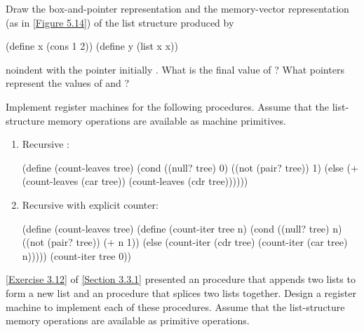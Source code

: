 \begin{exercise}
	\label{Exercise 5.20}
	Draw the box-and-pointer representation and the memory-vector representation (as in \cref{Figure 5.14}) of the list structure produced by
	\begin{scheme}
	  (define x (cons 1 2))
	  (define y (list x x))
	\end{scheme}
	noindent
	with the  pointer initially .
	What is the final value of  ?
	What pointers represent the values of  and  ?
\end{exercise}



\begin{exercise}
	\label{Exercise 5.21}
	Implement register machines for the following procedures.
	Assume that the list-structure memory operations are available as machine primitives.
	\begin{enumerate}[label = \alph*., leftmargin = *]

		\item
			Recursive :
			\begin{scheme}
			  (define (count-leaves tree)
			    (cond ((null? tree) 0)
			          ((not (pair? tree)) 1)
			          (else (+ (count-leaves (car tree))
			                   (count-leaves (cdr tree))))))
			\end{scheme}

		\item
			Recursive  with explicit counter:
			\begin{scheme}
			  (define (count-leaves tree)
			    (define (count-iter tree n)
			      (cond ((null? tree) n)
			            ((not (pair? tree)) (+ n 1))
			            (else
			             (count-iter (cdr tree)
			                         (count-iter (car tree)
			                                     n)))))
			    (count-iter tree 0))
			\end{scheme}

	\end{enumerate}
\end{exercise}



\begin{exercise}
	\label{Exercise 5.22}
	\cref{Exercise 3.12} of \cref{Section 3.3.1} presented an  procedure that appends two lists to form a new list and an  procedure that splices two lists together.
	Design a register machine to implement each of these procedures.
	Assume that the list-structure memory operations are available as primitive operations.
\end{exercise}
